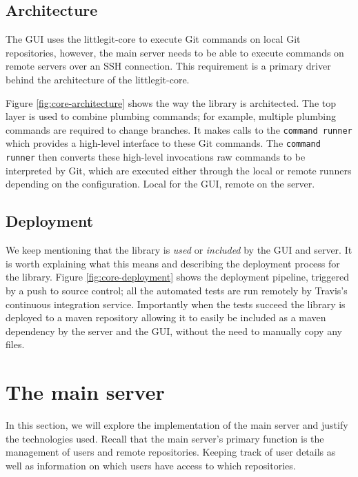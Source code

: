 \subsection{Architecture}\label{sec:core-architecture}

The GUI uses the littlegit-core to execute Git commands on local Git repositories, however, the main server needs to be able to execute commands on remote servers over an SSH connection. This requirement is a primary driver behind the architecture of the littlegit-core.

Figure \ref{fig:core-architecture} shows the way the library is architected. The top layer is used to combine plumbing commands; for example, multiple plumbing commands are required to change branches. It makes calls to the \texttt{command runner} which provides a high-level interface to these Git commands. The  \texttt{command runner} then converts these high-level invocations raw commands to be interpreted by Git, which are executed either through the local or remote runners depending on the configuration. Local for the GUI, remote on the server.



\subsection{Deployment}

We keep mentioning that the library is \emph{used} or \emph{included} by the GUI and server. It is worth explaining what this means and describing the deployment process for the library. Figure \ref{fig:core-deployment} shows the deployment pipeline, triggered by a push to source control; all the automated tests are run remotely by Travis's continuous integration service. Importantly when the tests succeed the library is deployed to a maven repository allowing it to easily be included as a maven dependency by the server and the GUI, without the need to manually copy any files.


\section{The main server}
In this section, we will explore the implementation of the main server and justify the technologies used. Recall that the main server's primary function is the management of users and remote repositories. Keeping track of user details as well as information on which users have access to which repositories. 


